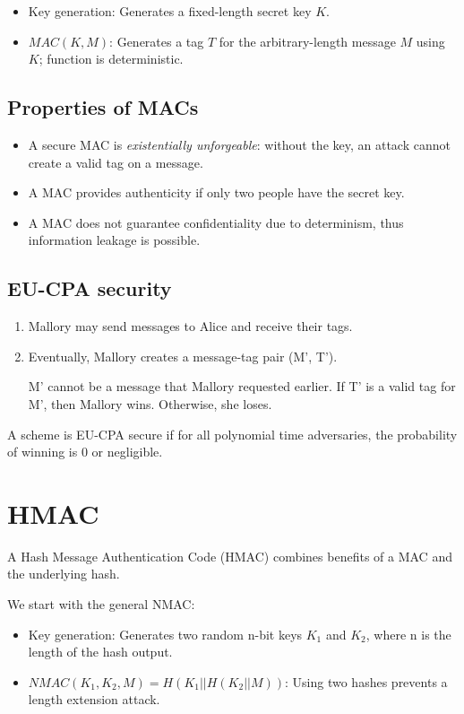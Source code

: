 \begin{itemize}
    \item Key generation: Generates a fixed-length secret key $K$.
    \item $MAC(K, M)$: Generates a tag $T$ for the arbitrary-length message $M$ using $K$; function is deterministic.
\end{itemize}

\subsection{Properties of MACs}
\begin{itemize}
    \item A secure MAC is \emph{existentially unforgeable}: without the key, an attack cannot create a valid tag on a message.
    \item A MAC provides authenticity if only two people have the secret key.
    \item A MAC does not guarantee confidentiality due to determinism, thus information leakage is possible.
\end{itemize}

\subsection{EU-CPA security}
\begin{enumerate}
    \item Mallory may send messages to Alice and receive their tags.
    \item Eventually, Mallory creates a message-tag pair (M', T').
    
    M' cannot be a message that Mallory requested earlier. If T' is a valid tag for M', then Mallory wins. Otherwise, she loses.
\end{enumerate}

A scheme is EU-CPA secure if for all polynomial time adversaries, the probability of winning is 0 or negligible.

\section{HMAC}
A Hash Message Authentication Code (HMAC) combines benefits of a MAC and the underlying hash. 

\medskip

We start with the general NMAC:
\begin{itemize}
    \item Key generation: Generates two random n-bit keys $K_1$ and $K_2$, where n is the length of the hash output.
    \item $NMAC(K_1, K_2, M) = H(K_1 || H(K_2 || M))$: Using two hashes prevents a length extension attack.
\end{itemize}

